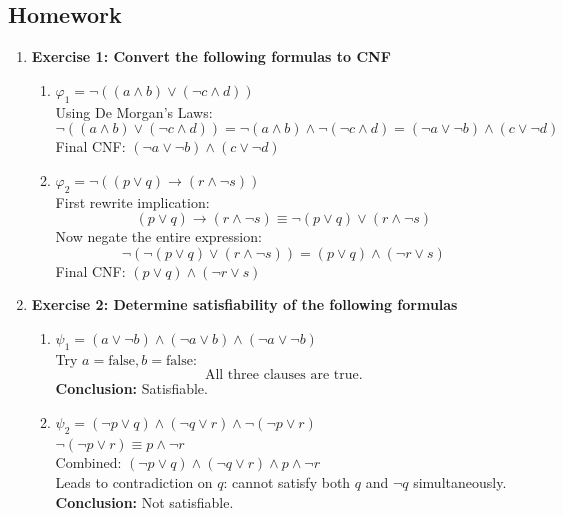 \documentclass{article}
\theoremstyle{theorem}
\theoremstyle{definition}
\theoremstyle{remark}
\begin{document}
\subsection*{Homework}
\begin{enumerate}
    \item \textbf{Exercise 1: Convert the following formulas to CNF}
    \begin{enumerate}
        \item $\varphi_1 = \neg((a \land b) \lor (\neg c \land d))$\\
        Using De Morgan's Laws:
        \[
        \neg((a \land b) \lor (\neg c \land d)) = \neg(a \land b) \land \neg(\neg c \land d) = (\neg a \lor \neg b) \land (c \lor \neg d)
        \]
        Final CNF: $(\neg a \lor \neg b) \land (c \lor \neg d)$

        \item $\varphi_2 = \neg((p \lor q) \rightarrow (r \land \neg s))$\\
        First rewrite implication:
        \[
        (p \lor q) \rightarrow (r \land \neg s) \equiv \neg(p \lor q) \lor (r \land \neg s)
        \]
        Now negate the entire expression:
        \[
        \neg(\neg(p \lor q) \lor (r \land \neg s)) = (p \lor q) \land (\neg r \lor s)
        \]
        Final CNF: $(p \lor q) \land (\neg r \lor s)$
    \end{enumerate}

    \item \textbf{Exercise 2: Determine satisfiability of the following formulas}
    \begin{enumerate}
        \item $\psi_1 = (a \lor \neg b) \land (\neg a \lor b) \land (\neg a \lor \neg b)$\\
        Try $a = \text{false}, b = \text{false}$:
        \[
        \text{All three clauses are true.}
        \]
        \textbf{Conclusion:} Satisfiable.

        \item $\psi_2 = (\neg p \lor q) \land (\neg q \lor r) \land \neg(\neg p \lor r)$\\
        $\neg(\neg p \lor r) \equiv p \land \neg r$\\
        Combined: $(\neg p \lor q) \land (\neg q \lor r) \land p \land \neg r$\\
        Leads to contradiction on $q$: cannot satisfy both $q$ and $\neg q$ simultaneously.\\
        \textbf{Conclusion:} Not satisfiable.


\end{enumerate}
\end{enumerate}
\end{document}

